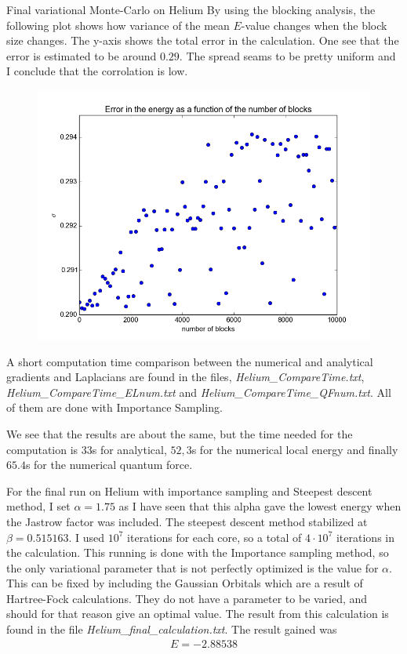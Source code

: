 \documentclass[a4paper, 12pt, titlepage]{article}
\begin{document}
\begin{section}{Final variational Monte-Carlo on Helium}
 By using the blocking analysis, the following plot shows how variance of the mean $E$-value changes when the block size changes. The y-axis shows the total error in the calculation. 
 One see that the error is estimated to be around $0.29$. The spread seams to be pretty uniform and I conclude that the corrolation is low. 
 \begin{figure}[H] 
 	\centering
 	\includegraphics[width=\textwidth]{../python_programs/HeliumBlocking.png}
 \end{figure}

 A short computation time comparison between the numerical and analytical gradients and Laplacians are found in the files, \textit{Helium\_CompareTime.txt}, \textit{Helium\_CompareTime\_ELnum.txt} and \textit{Helium\_CompareTime\_QFnum.txt}. All of them are done with Importance Sampling. 

 We see that the results are about the same, but the time needed for the computation is $33$s for analytical, $52,3$s for the numerical local energy and finally $65.4$s for the numerical quantum force. 

 For the final run on Helium with importance sampling and Steepest descent method, I set $\alpha = 1.75$ as I have seen that this alpha gave the lowest energy when the Jastrow factor was included. The steepest descent method stabilized at $\beta = 0.515163$. I used $10^7$ iterations for each core, so a total of $4 \cdot 10^7$ iterations in the calculation. This running is done with the Importance sampling method, so the only variational parameter that is not perfectly optimized is the value for $\alpha$. This can be fixed by including the Gaussian Orbitals which are a result of Hartree-Fock calculations. They do not have a parameter to be varied, and should for that reason give an optimal value. The result from this calculation is found in the file \textit{Helium\_final\_calculation.txt}. The result gained was
 \begin{align*}
 	E = -2.88538
 \end{align*}

\end{section}
\end{document}
